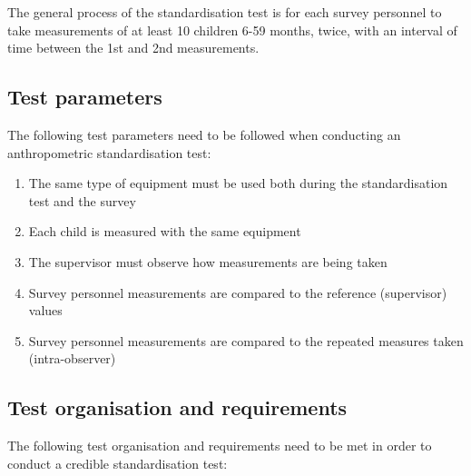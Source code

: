 \documentclass[12pt,a4paper]{book}
\theoremstyle{definition}
\theoremstyle{definition}
\theoremstyle{definition}
\theoremstyle{remark}
\begin{document}
The general process of the standardisation test is for each survey
personnel to take measurements of at least 10 children 6-59 months,
twice, with an interval of time between the 1st and 2nd measurements.

\hypertarget{test-parameters}{%
\subsection{Test parameters}\label{test-parameters}}

The following test parameters need to be followed when conducting an
anthropometric standardisation test:

\begin{enumerate}
\def\labelenumi{\arabic{enumi}.}
\item
  The same type of equipment must be used both during the
  standardisation test and the survey
\item
  Each child is measured with the same equipment
\item
  The supervisor must observe how measurements are being taken
\item
  Survey personnel measurements are compared to the reference
  (supervisor) values
\item
  Survey personnel measurements are compared to the repeated measures
  taken (intra-observer)
\end{enumerate}

\hypertarget{test-organisation-and-requirements}{%
\subsection{Test organisation and
requirements}\label{test-organisation-and-requirements}}

The following test organisation and requirements need to be met in order
to conduct a credible standardisation test:
\end{document}
